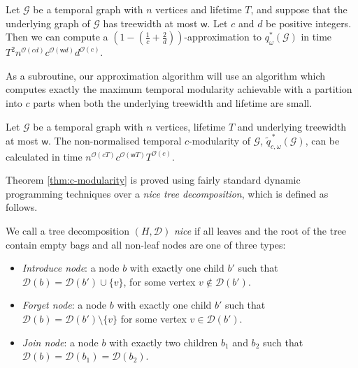 \documentclass[runningheads]{llncs}
\newcommand{\cG}{\mathcal{G}}
\newcommand{\w}{\mathsf{w}}
\begin{document}
\begin{theorem}\label{thm:tw-approx}
    Let $\mathcal{G}$ be a temporal graph with $n$ vertices and lifetime $T$, and suppose that the underlying graph of $\mathcal{G}$ has treewidth at most $\w$. Let $c$ and $d$ be positive integers. Then we can compute a $\left(1-(\frac{1}{c}+\frac{2}{d})\right)$-approximation to $q^*_\omega(\mathcal{G})$ in time $T^2n^{\mathcal{O}(cd)}c^{\mathcal{O}(\w d)}d^{\mathcal{O}(c)}$. 
\end{theorem}



As a subroutine, our approximation algorithm will use an algorithm which computes exactly the maximum temporal modularity achievable with a partition into $c$ parts when both the underlying treewidth and lifetime are small.


\begin{theorem}\label{thm:c-modularity}
Let $\cG$ be a temporal graph with $n$ vertices, lifetime $T$ and underlying treewidth at most $\w$. The non-normalised temporal $c$-modularity of $\cG$, $\widetilde{q}^{\,*}_{c,\omega}(\mathcal{G})$, can be calculated in time $n^{\mathcal{O}(cT)}c^{\mathcal{O}(\w T)}T^{\mathcal{O}(c)}$.
\end{theorem}

Theorem \ref{thm:c-modularity} is proved using fairly standard dynamic programming techniques over a \emph{nice tree decomposition}, which is defined as follows.

\begin{definition}\cite{cygan2015Algorithms}
We call a tree decomposition $(H,\mathcal{D})$ \emph{nice} if all leaves and the root of the tree contain empty bags and all non-leaf nodes are one of three types:
\begin{itemize}
    \item \emph{Introduce node}: a node $b$ with exactly one child $b'$ such that $\mathcal{D}(b)=\mathcal{D}(b')\cup \{v\}$, for some vertex $v \notin \mathcal{D}(b')$.
    \item \emph{Forget node}: a node $b$ with exactly one child $b'$ such that $\mathcal{D}(b)=\mathcal{D}(b')\setminus \{v\}$ for some vertex $v \in \mathcal{D}(b')$.
    \item \emph{Join node}: a node $b$ with exactly two children $b_1$ and $b_2$ such that $\mathcal{D}(b)=\mathcal{D}(b_1)=\mathcal{D}(b_2)$.
\end{itemize}
\end{definition}
\end{document}
